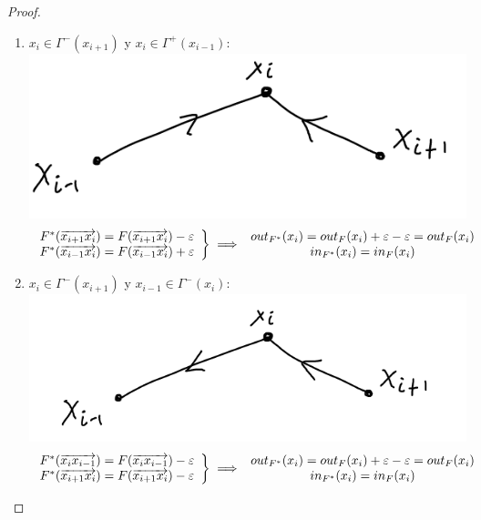 \begin{proof}
\begin{enumerate}
\item $x_i \in \Gamma^-(x_{i+1})$ y $x_i\in \Gamma^+(x_{i-1}):$ \includegraphics[scale=0.4]{img/forward-backward.png}\\
\begin{align}
    \left.
    \begin{array}{cc}
    F^*(\overrightarrow{x_{i+1} x_i}) = F(\overrightarrow{x_{i+1} x_i}) - \varepsilon\\
    F^*(\overrightarrow{x_{i-1} x_i}) = F(\overrightarrow{x_{i-1} x_i}) + \varepsilon 
    \end{array}
     \right\} \implies
     \begin{array}{cc}
    out_{F^*}(x_i) = out_F(x_i) + \varepsilon -  \varepsilon = out_F(x_i)\\
    in_{F^*} (x_i) = in_F(x_i)
    \end{array}
\end{align}

\item $x_{i}\in \Gamma^-(x_{i+1})$ y $x_{i-1} \in \Gamma^-(x_{i})$: \includegraphics[scale=0.4]{img/backward-backward.png}
\begin{align}
    \left.
    \begin{array}{cc}
    F^*(\overrightarrow{x_i x_{i-1}}) = F(\overrightarrow{x_{i} x_{i-1}}) - \varepsilon\\
    F^*(\overrightarrow{x_{i+1} x_{i}}) = F(\overrightarrow{x_{i+1} x_{i}}) - \varepsilon 
    \end{array}
     \right\} \implies
     \begin{array}{cc}
    out_{F^*}(x_i) = out_F(x_i) + \varepsilon -  \varepsilon = out_F(x_i)\\
    in_{F^*} (x_i) = in_F(x_i)
    \end{array}
\end{align}


\end{enumerate}
\end{proof}
